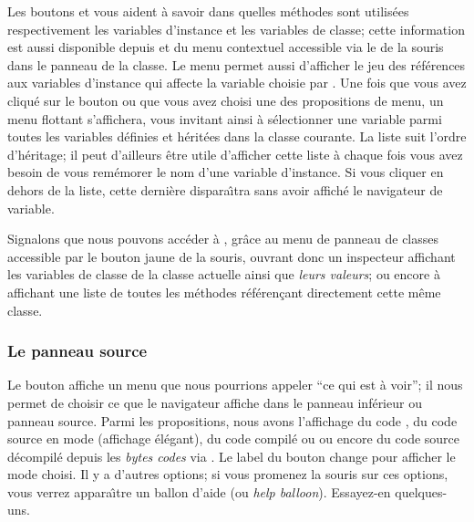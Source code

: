 \documentclass[a4paper,10pt,twoside]{book}
\begin{document}
Les boutons  et  vous aident \`a savoir
dans quelles m\'ethodes sont utilis\'ees respectivement les variables d'instance
et les variables de classe; cette information est aussi disponible depuis 
 et  du menu contextuel accessible via le 
 de la souris dans le panneau de la classe.
Le menu permet aussi d'afficher le jeu 
des r\'ef\'erences aux variables d'instance qui affecte la variable choisie
par .
Une fois que vous avez cliqu\'e sur le bouton ou que vous avez choisi une
des propositions de menu, un menu flottant s'affichera, vous invitant ainsi
\`a s\'electionner une variable parmi toutes les variables d\'efinies et
h\'erit\'ees dans la classe courante.
La liste suit l'ordre d'h\'eritage; il peut d'ailleurs \^etre utile d'afficher
cette liste \`a chaque fois vous avez besoin de vous rem\'emorer le nom d'une
variable d'instance. Si vous cliquer en dehors de la liste, cette derni\`ere
dispara\^{\i}tra sans avoir affich\'e le navigateur de variable.

Signalons que nous pouvons acc\'eder \`a ,
gr\^ace au menu de panneau de classes accessible par le bouton jaune
de la souris, 
ouvrant donc un inspecteur affichant les variables de classe 
de la classe actuelle ainsi que \emph{leurs valeurs};
ou encore \`a
 affichant une liste de toutes les m\'ethodes
r\'ef\'eren\c{c}ant directement cette m\^eme classe.

\subsubsection{Le panneau source}
\label{sec:sources}

Le bouton  affiche un menu que nous pourrions appeler
``ce qui est \`a voir''; il nous permet de choisir ce que le navigateur
affiche dans le panneau inf\'erieur ou panneau source.
Parmi les propositions, nous avons l'affichage du code , 
du code source en mode  (affichage \'el\'egant), 
du code compil\'e ou  ou encore du code source
d\'ecompil\'e depuis les \emph{bytes codes} via .
Le label du bouton change pour afficher le mode choisi. Il y a d'autres
options; si vous promenez la souris sur ces options, vous verrez
appara\^{\i}tre un ballon d'aide (ou \emph{help balloon}). Essayez-en
quelques-uns. 
\end{document}

